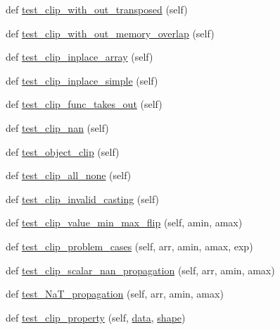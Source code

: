 \begin{DoxyCompactItemize}
\item 
def \hyperlink{classnumpy_1_1core_1_1tests_1_1test__numeric_1_1TestClip_afe862ba65c21e601d4cdc7959c8b4889}{test\+\_\+clip\+\_\+with\+\_\+out\+\_\+transposed} (self)
\item 
def \hyperlink{classnumpy_1_1core_1_1tests_1_1test__numeric_1_1TestClip_a8f0607f1a2df27e5a82800ffe025b324}{test\+\_\+clip\+\_\+with\+\_\+out\+\_\+memory\+\_\+overlap} (self)
\item 
def \hyperlink{classnumpy_1_1core_1_1tests_1_1test__numeric_1_1TestClip_a7e9e0939fc740baadbc14da9d87a8f1d}{test\+\_\+clip\+\_\+inplace\+\_\+array} (self)
\item 
def \hyperlink{classnumpy_1_1core_1_1tests_1_1test__numeric_1_1TestClip_aca82e393ff249ac73a13b71187bc41cc}{test\+\_\+clip\+\_\+inplace\+\_\+simple} (self)
\item 
def \hyperlink{classnumpy_1_1core_1_1tests_1_1test__numeric_1_1TestClip_af4f88dc6a4347c2517794dc3a06513c6}{test\+\_\+clip\+\_\+func\+\_\+takes\+\_\+out} (self)
\item 
def \hyperlink{classnumpy_1_1core_1_1tests_1_1test__numeric_1_1TestClip_ada313c2674ec6484672c95c106fe1951}{test\+\_\+clip\+\_\+nan} (self)
\item 
def \hyperlink{classnumpy_1_1core_1_1tests_1_1test__numeric_1_1TestClip_aab12a816a1183ba51470ab185f5c5d76}{test\+\_\+object\+\_\+clip} (self)
\item 
def \hyperlink{classnumpy_1_1core_1_1tests_1_1test__numeric_1_1TestClip_a76a7829b5b089e469fd9ca462934c418}{test\+\_\+clip\+\_\+all\+\_\+none} (self)
\item 
def \hyperlink{classnumpy_1_1core_1_1tests_1_1test__numeric_1_1TestClip_a1b3b0fb751984d6af79af45ceae670fa}{test\+\_\+clip\+\_\+invalid\+\_\+casting} (self)
\item 
def \hyperlink{classnumpy_1_1core_1_1tests_1_1test__numeric_1_1TestClip_a410083982bdaee604f0e9f9c47de46bc}{test\+\_\+clip\+\_\+value\+\_\+min\+\_\+max\+\_\+flip} (self, amin, amax)
\item 
def \hyperlink{classnumpy_1_1core_1_1tests_1_1test__numeric_1_1TestClip_aa046ced692eb772ecae4013b29ec31cc}{test\+\_\+clip\+\_\+problem\+\_\+cases} (self, arr, amin, amax, exp)
\item 
def \hyperlink{classnumpy_1_1core_1_1tests_1_1test__numeric_1_1TestClip_a845c9203eebce1258b3841fe78568c9f}{test\+\_\+clip\+\_\+scalar\+\_\+nan\+\_\+propagation} (self, arr, amin, amax)
\item 
def \hyperlink{classnumpy_1_1core_1_1tests_1_1test__numeric_1_1TestClip_a93320b8c79093fbf5986c800cc921f9c}{test\+\_\+\+Na\+T\+\_\+propagation} (self, arr, amin, amax)
\item 
def \hyperlink{classnumpy_1_1core_1_1tests_1_1test__numeric_1_1TestClip_abc2292189a556449b1f0d1547db18145}{test\+\_\+clip\+\_\+property} (self, \hyperlink{classnumpy_1_1core_1_1tests_1_1test__numeric_1_1TestClip_a739b854976645f08a33ea262d4e1fc87}{data}, \hyperlink{classnumpy_1_1core_1_1tests_1_1test__numeric_1_1TestClip_af7f3665c5fb9239d2df8144f450bc8bf}{shape})
\end{DoxyCompactItemize}
